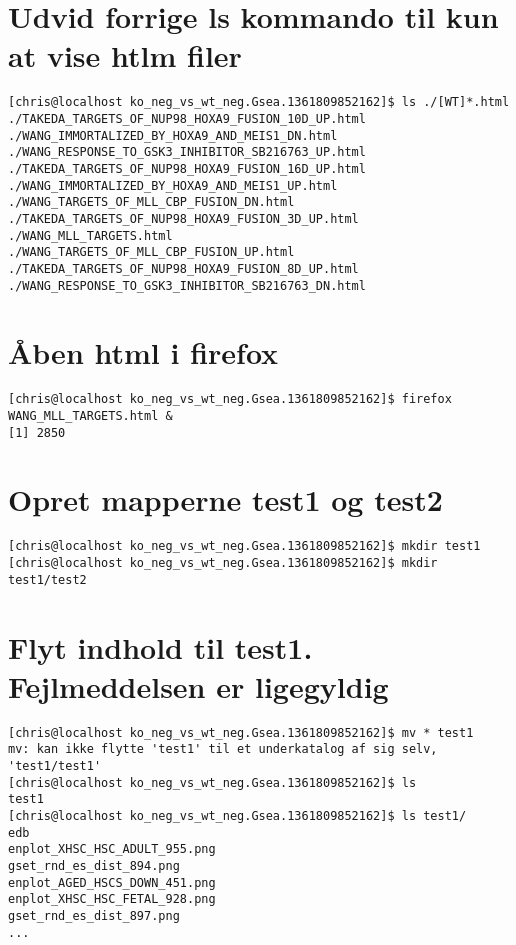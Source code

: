 \documentclass[12pt]{article}
\begin{document}
\section{Udvid forrige ls kommando til kun at vise htlm filer}

\begin{lstlisting}
[chris@localhost ko_neg_vs_wt_neg.Gsea.1361809852162]$ ls ./[WT]*.html
./TAKEDA_TARGETS_OF_NUP98_HOXA9_FUSION_10D_UP.html
./WANG_IMMORTALIZED_BY_HOXA9_AND_MEIS1_DN.html
./WANG_RESPONSE_TO_GSK3_INHIBITOR_SB216763_UP.html
./TAKEDA_TARGETS_OF_NUP98_HOXA9_FUSION_16D_UP.html
./WANG_IMMORTALIZED_BY_HOXA9_AND_MEIS1_UP.html
./WANG_TARGETS_OF_MLL_CBP_FUSION_DN.html
./TAKEDA_TARGETS_OF_NUP98_HOXA9_FUSION_3D_UP.html
./WANG_MLL_TARGETS.html
./WANG_TARGETS_OF_MLL_CBP_FUSION_UP.html
./TAKEDA_TARGETS_OF_NUP98_HOXA9_FUSION_8D_UP.html
./WANG_RESPONSE_TO_GSK3_INHIBITOR_SB216763_DN.html
\end{lstlisting}

\section{Åben html i firefox}

\begin{lstlisting}
[chris@localhost ko_neg_vs_wt_neg.Gsea.1361809852162]$ firefox WANG_MLL_TARGETS.html &
[1] 2850
\end{lstlisting}

\section{Opret mapperne test1 og test2}

\begin{lstlisting}
[chris@localhost ko_neg_vs_wt_neg.Gsea.1361809852162]$ mkdir test1
[chris@localhost ko_neg_vs_wt_neg.Gsea.1361809852162]$ mkdir test1/test2
\end{lstlisting}

\section{Flyt indhold til test1. Fejlmeddelsen er ligegyldig}

\begin{lstlisting}
[chris@localhost ko_neg_vs_wt_neg.Gsea.1361809852162]$ mv * test1
mv: kan ikke flytte 'test1' til et underkatalog af sig selv, 'test1/test1'
[chris@localhost ko_neg_vs_wt_neg.Gsea.1361809852162]$ ls
test1
[chris@localhost ko_neg_vs_wt_neg.Gsea.1361809852162]$ ls test1/
edb
enplot_XHSC_HSC_ADULT_955.png
gset_rnd_es_dist_894.png
enplot_AGED_HSCS_DOWN_451.png
enplot_XHSC_HSC_FETAL_928.png
gset_rnd_es_dist_897.png
...
\end{lstlisting}
\end{document}

